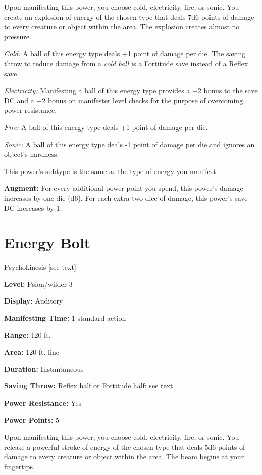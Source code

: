 \documentclass{article}
\begin{document}
Upon manifesting this power, you choose cold, electricity, fire, or sonic. You 
create an explosion of energy of the chosen type that deals 7d6 points of damage 
to every creature or object within the area. The explosion creates almost no pressure.

\textit{Cold: }A ball of this energy type deals +1 point of damage per die. The 
saving throw to reduce damage from a \textit{cold ball }is a Fortitude save instead 
of a Reflex save.

\textit{Electricity: }Manifesting a ball of this energy type provides a +2 bonus 
to the save DC and a +2 bonus on manifester level checks for the purpose of overcoming 
power resistance.

\textit{Fire: }A ball of this energy type deals +1 point of damage per die. 

\textit{Sonic: }A ball of this energy type deals -1 point of damage per die and 
ignores an object's hardness.

This power's subtype is the same as the type of energy you manifest. 

\textbf{Augment:} For every additional power point you spend, this power's damage 
increases by one die (d6). For each extra two dice of damage, this power's save 
DC increases by 1. 

\vspace{12pt}
\section*{Energy Bolt}

Psychokinesis [see text]

\textbf{Level:} Psion/wilder 3

\textbf{Display:} Auditory

\textbf{Manifesting Time:} 1 standard action

\textbf{Range:} 120 ft.

\textbf{Area:} 120-ft. line

\textbf{Duration:} Instantaneous

\textbf{Saving Throw:} Reflex half or Fortitude half; see text

\textbf{Power Resistance:} Yes

\textbf{Power Points:} 5

Upon manifesting this power, you choose cold, electricity, fire, or sonic. You 
release a powerful stroke of energy of the chosen type that deals 5d6 points of 
damage to every creature or object within the area. The beam begins at your fingertips.
\end{document}
